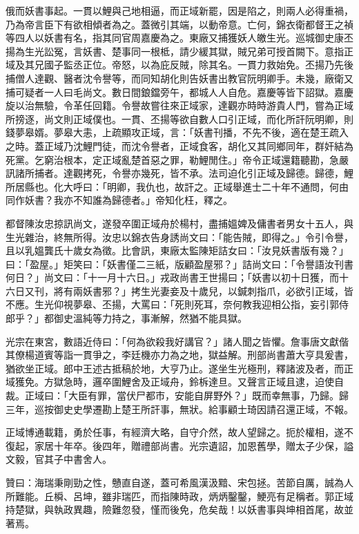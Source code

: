 \begin{pinyinscope}
俄而妖書事起。一貫以鯉與己地相逼，而正域新罷，因是陷之，則兩人必得重禍，乃為帝言臣下有欲相傾者為之。蓋微引其端，以動帝意。亡何，錦衣衛都督王之禎等四人以妖書有名，指其同官周嘉慶為之。東廠又捕獲妖人皦生光。巡城御史康丕揚為生光訟冤，言妖書、楚事同一根柢，請少緩其獄，賊兄弟可授首闕下。意指正域及其兄國子監丞正位。帝怒，以為庇反賊，除其名。一貫力救始免。丕揚乃先後捕僧人達觀、醫者沈令譽等，而同知胡化則告妖書出教官阮明卿手。未幾，廠衛又捕可疑者一人曰毛尚文。數日間鋃鐺旁午，都城人人自危。嘉慶等皆下詔獄。嘉慶旋以治無驗，令革任回籍。令譽故嘗往來正域家，達觀亦時時游貴人門，嘗為正域所搒逐，尚文則正域僕也。一貫、丕揚等欲自數人口引正域，而化所訐阮明卿，則錢夢皋婿。夢皋大恚，上疏顯攻正域，言：「妖書刊播，不先不後，適在楚王疏入之時。蓋正域乃沈鯉門徒，而沈令譽者，正域食客，胡化又其同鄉同年，群奸結為死黨。乞窮治根本，定正域亂楚首惡之罪，勒鯉閒住。」帝令正域還籍聽勘，急嚴訊諸所捕者。達觀拷死，令譽亦幾死，皆不承。法司迫化引正域及歸德。歸德，鯉所居縣也。化大呼曰：「明卿，我仇也，故訐之。正域舉進士二十年不通問，何由同作妖書？我亦不知誰為歸德者。」帝知化枉，釋之。

都督陳汝忠掠訊尚文，遂發卒圍正域舟於楊村，盡捕媼婢及傭書者男女十五人，與生光雜治，終無所得。汝忠以錦衣告身誘尚文曰：「能告賊，即得之。」令引令譽，且以乳媼龔氏十歲女為徵。比會訊，東廠太監陳矩詰女曰：「汝見妖書版有幾？」曰：「盈屋。」矩笑曰：「妖書僅二三紙，版顧盈屋邪？」詰尚文曰：「令譽語汝刊書何日？」尚文曰：「十一月十六日。」戎政尚書王世揚曰；「妖書以初十日獲，而十六日又刊，將有兩妖書邪？」拷生光妻妾及十歲兒，以鍼刺指爪，必欲引正域，皆不應。生光仰視夢皋、丕揚，大罵曰：「死則死耳，奈何教我迎相公指，妄引郭侍郎乎？」都御史溫純等力持之，事漸解，然猶不能具獄。

光宗在東宮，數語近侍曰：「何為欲殺我好講官？」諸人聞之皆懼。詹事唐文獻偕其僚楊道賓等詣一貫爭之，李廷機亦力為之地，獄益解。刑部尚書蕭大亨具爰書，猶欲坐正域。郎中王述古抵稿於地，大亨乃止。遂坐生光極刑，釋諸波及者，而正域獲免。方獄急時，邏卒圍鯉舍及正域舟，鈴柝達旦。又聲言正域且逮，迫使自裁。正域曰：「大臣有罪，當伏尸都市，安能自屏野外？」既而幸無事，乃歸。歸三年，巡按御史史學遷勘上楚王所訐事，無狀。給事顧士琦因請召還正域，不報。

正域博通載籍，勇於任事，有經濟大略，自守介然，故人望歸之。扼於權相，遂不復起，家居十年卒。後四年，贈禮部尚書。光宗遺詔，加恩舊學，贈太子少保，謚文毅，官其子中書舍人。

贊曰：海瑞秉剛勁之性，戇直自遂，蓋可希風漢汲黯、宋包拯。苦節自厲，誠為人所難能。丘橓、呂坤，雖非瑞匹，而指陳時政，炳炳鑿鑿，鯁亮有足稱者。郭正域持楚獄，與執政異趣，險難忽發，慬而後免，危矣哉！以妖書事與坤相首尾，故並著焉。


\end{pinyinscope}